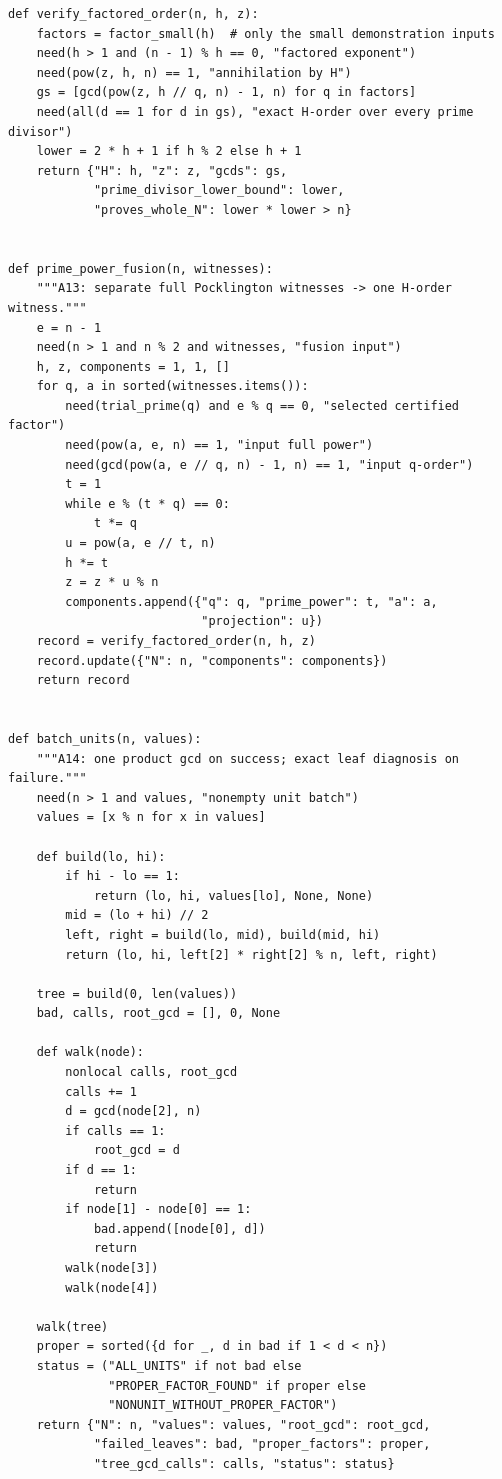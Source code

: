 \documentclass[11pt,a4paper]{article}
\theoremstyle{definition}\newtheorem{definition}[theorem]{Definition}
\theoremstyle{remark}\newtheorem{remark}[theorem]{Remark}
\begin{document}
\begin{lstlisting}[label=lst:certificates]
def verify_factored_order(n, h, z):
    factors = factor_small(h)  # only the small demonstration inputs
    need(h > 1 and (n - 1) % h == 0, "factored exponent")
    need(pow(z, h, n) == 1, "annihilation by H")
    gs = [gcd(pow(z, h // q, n) - 1, n) for q in factors]
    need(all(d == 1 for d in gs), "exact H-order over every prime divisor")
    lower = 2 * h + 1 if h % 2 else h + 1
    return {"H": h, "z": z, "gcds": gs,
            "prime_divisor_lower_bound": lower,
            "proves_whole_N": lower * lower > n}


def prime_power_fusion(n, witnesses):
    """A13: separate full Pocklington witnesses -> one H-order witness."""
    e = n - 1
    need(n > 1 and n % 2 and witnesses, "fusion input")
    h, z, components = 1, 1, []
    for q, a in sorted(witnesses.items()):
        need(trial_prime(q) and e % q == 0, "selected certified factor")
        need(pow(a, e, n) == 1, "input full power")
        need(gcd(pow(a, e // q, n) - 1, n) == 1, "input q-order")
        t = 1
        while e % (t * q) == 0:
            t *= q
        u = pow(a, e // t, n)
        h *= t
        z = z * u % n
        components.append({"q": q, "prime_power": t, "a": a,
                           "projection": u})
    record = verify_factored_order(n, h, z)
    record.update({"N": n, "components": components})
    return record


def batch_units(n, values):
    """A14: one product gcd on success; exact leaf diagnosis on failure."""
    need(n > 1 and values, "nonempty unit batch")
    values = [x % n for x in values]

    def build(lo, hi):
        if hi - lo == 1:
            return (lo, hi, values[lo], None, None)
        mid = (lo + hi) // 2
        left, right = build(lo, mid), build(mid, hi)
        return (lo, hi, left[2] * right[2] % n, left, right)

    tree = build(0, len(values))
    bad, calls, root_gcd = [], 0, None

    def walk(node):
        nonlocal calls, root_gcd
        calls += 1
        d = gcd(node[2], n)
        if calls == 1:
            root_gcd = d
        if d == 1:
            return
        if node[1] - node[0] == 1:
            bad.append([node[0], d])
            return
        walk(node[3])
        walk(node[4])

    walk(tree)
    proper = sorted({d for _, d in bad if 1 < d < n})
    status = ("ALL_UNITS" if not bad else
              "PROPER_FACTOR_FOUND" if proper else
              "NONUNIT_WITHOUT_PROPER_FACTOR")
    return {"N": n, "values": values, "root_gcd": root_gcd,
            "failed_leaves": bad, "proper_factors": proper,
            "tree_gcd_calls": calls, "status": status}



\end{lstlisting}
\end{document}
